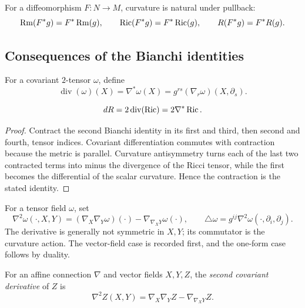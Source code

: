 For a diffeomorphism $F:N\to M$, curvature is natural under pullback:
\[
  \operatorname{Rm}(F^*g)=F^*\operatorname{Rm}(g),\qquad
  \operatorname{Ric}(F^*g)=F^*\operatorname{Ric}(g),\qquad
  R(F^*g)=F^*R(g).
\]

\subsection{Consequences of the Bianchi identities}

For a covariant $2$-tensor $\omega$, define
\[
  \operatorname{div}(\omega)(X)=\nabla^*\omega(X)
  =g^{rs}(\nabla_r\omega)(X,\partial_s).
\]

\begin{lemma}
\label{lem:div-ricci-scalar-curvature}


\label{divRic}



$$dR=2\operatorname{div}(\operatorname{Ric})=2\nabla^*\operatorname{Ric}.$$
\end{lemma}

\begin{proof}
\sketch

Contract the second Bianchi identity in its first and third, then second and fourth, tensor indices. Covariant differentiation commutes with contraction because the metric is parallel. Curvature antisymmetry turns each of the last two contracted terms into minus the divergence of the Ricci tensor, while the first becomes the differential of the scalar curvature. Hence the contraction is the stated identity.
\end{proof}


For a tensor field $\omega$, set
\[
  \nabla^2\omega(\cdot,X,Y)
  =(\nabla_X\nabla_Y\omega)(\cdot)-\nabla_{\nabla_XY}\omega(\cdot),
  \qquad
  \triangle\omega=g^{ij}\nabla^2\omega(\cdot,\partial_i,\partial_j).
\]
The derivative is generally not symmetric in $X,Y$; its commutator is
the curvature action. The vector-field case is recorded first, and the
one-form case follows by duality.

\begin{definition}
\label{def:second-covariant-derivative-vector-field}





For an affine connection $\nabla$ and vector fields $X,Y,Z$, the
\emph{second covariant derivative} of $Z$ is
\[
  \nabla^2Z(X,Y)=\nabla_X\nabla_YZ-\nabla_{\nabla_XY}Z.
\]
\end{definition}

